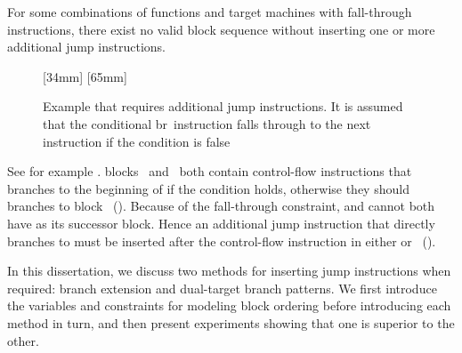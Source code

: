 For some combinations of \glspl{function} and \glspl{target machine} with
\gls{fall-through} \glspl{instruction}, there exist no valid \gls{block}
sequence without inserting one or more additional jump \glspl{instruction}.
%
\begin{figure}
  \setlength{\opNodeDist}{20pt}%

  \mbox{}%
  \hfill%
                [34mm]%
                {%
                }%
  \hfill%
                [65mm]%
                {%
                  \hspace{6mm}%
                }%
  \hfill%
  \mbox{}

  \caption[Example that requires additional jump instructions]%
          {%
            Example that requires additional jump instructions.
            It is assumed that the conditional {\instrFont br}~instruction
            falls through to the next instruction if the condition is false%
          }
\end{figure}
%
See for example .
%
\Glspl{block}~ and~ both contain control-flow
\glspl{instruction} that branches to the beginning of  if the
condition holds, otherwise they should branches to block~
().
%
Because of the fall-through \gls{constraint},  and  cannot
both have  as its successor \gls{block}.
%
Hence an additional jump \gls{instruction} that directly branches to 
must be inserted after the control-flow \gls{instruction} in either 
or~ ().

In this dissertation, we discuss two methods for inserting jump
\glspl{instruction} when required: \gls{branch extension} and \glspl{dual-target
  branch pattern}.
%
We first introduce the \glspl{variable} and \glspl{constraint} for modeling
\gls{block ordering} before introducing each method in turn, and then present
experiments showing that one is superior to the other.


